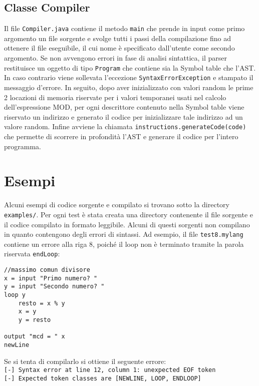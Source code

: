 \documentclass[10pt,a4paper]{article}
\begin{document}
\subsection{Classe Compiler}
Il file \texttt{Compiler.java} contiene il metodo \texttt{main} che prende in input come primo argomento un file sorgente e svolge tutti i passi della compilazione fino ad ottenere il file eseguibile, il cui nome è specificato dall'utente come secondo argomento.
Se non avvengono errori in fase di analisi sintattica, il parser restituisce un oggetto di tipo \texttt{Program} che contiene sia la Symbol table che l'AST. In caso contrario viene sollevata l'eccezione \texttt{SyntaxErrorException} e stampato il messaggio d'errore. In seguito, dopo aver inizializzato con valori random le prime 2 locazioni di memoria riservate per i valori temporanei usati nel calcolo dell'espressione MOD, per ogni descrittore contenuto nella Symbol table viene riservato un indirizzo e generato il codice per inizializzare tale indirizzo ad un valore random. Infine avviene la chiamata \texttt{instructions.generateCode(code)} che permette di scorrere in profondità l'AST e generare il codice per l'intero programma.

\section{Esempi}
Alcuni esempi di codice sorgente e compilato si trovano sotto la directory \texttt{examples/}. Per ogni test è stata creata una directory contenente il file sorgente e il codice compilato in formato leggibile. Alcuni di questi sorgenti non compilano in quanto contengono degli errori di sintassi. Ad esempio, il file \texttt{test8.mylang} contiene un errore alla riga 8, poiché il loop non è terminato tramite la parola riservata \texttt{endLoop}:

\lstset{numbers=left, numberstyle=\small, numbersep=8pt, frame=leftline, xleftmargin=20pt}
\lstset{basicstyle=\ttfamily,breaklines=true}
\begin{lstlisting} 
//massimo comun divisore
x = input "Primo numero? "
y = input "Secondo numero? "
loop y
    resto = x % y 
    x = y
    y = resto

output "mcd = " x
newLine
\end{lstlisting}

Se si tenta di compilarlo si ottiene il seguente errore: \\
\texttt{[-] Syntax error at line 12, column 1: unexpected EOF token}\\
\texttt{[-] Expected token classes are [NEWLINE, LOOP, ENDLOOP]}
\end{document}
